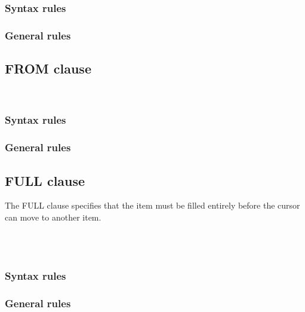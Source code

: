 \subsubsection{Syntax rules}

\subsubsection{General rules}

\subsection{FROM clause}

\begin{syntax}
  \begin{1=}
    \identifier \\
    \literal
  \end{1=}
\end{syntax}

\subsubsection{Syntax rules}

\subsubsection{General rules}

\subsection{FULL clause}

The FULL clause specifies that the item must be filled entirely before the cursor can move to another item.

\begin{syntax}
  \begin{1=}
     \\
     \\
  \end{1=}
\end{syntax}

\subsubsection{Syntax rules}

\subsubsection{General rules}

